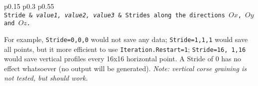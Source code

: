 {
\centering
\setlength{\tabcolsep}{0pt}
\footnotesize

%
\begin{longtable}{p{} p{} p{}}
%
\\
%
\tt Stride & {\it value1, value2, value3} & Strides along the directions $Ox$, $Oy$ and $Oz$.
\end{longtable}

}

For example, {\tt Stride=0,0,0} would not save any data; {\tt Stride=1,1,1} would save all points, but it more efficient to use {\tt Iteration.Restart=1}; {\tt Stride=16, 1,16} would save vertical profiles every 16x16 horizontal point. A Stride of 0 has no effect whatsoever (no output will be generated). \textit{Note: vertical corse graining is not tested, but should work. }

